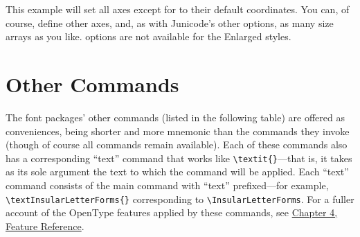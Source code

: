 \noindent This example will set all axes except for  to their default coordinates.
You can, of course, define other axes, and, as with Junicode’s other  options,
as many size arrays as you like.  options are not available for the Enlarged 
styles.

\section{Other Commands}

The font packages’ other commands (listed in the following table) are offered as conveniences,
being shorter and more
mnemonic than the {\fspec} commands they invoke (though of course all {\fspec} commands
remain available). Each of these commands
also has a corresponding “text” command that works like 
{\color{BrickRed}\verb|\textit{}|}---that is, it takes
as its sole argument the text to which the command will be applied. Each “text” command
consists of the main command with “text” prefixed---for example,
{\color{BrickRed}\verb|\textInsularLetterForms{}|}
corresponding to {\color{BrickRed}\verb|\InsularLetterForms|}.  For a fuller account of the OpenType features
applied by these commands, see \hyperlink{FeatureReference}{Chapter 4, Feature Reference}.

